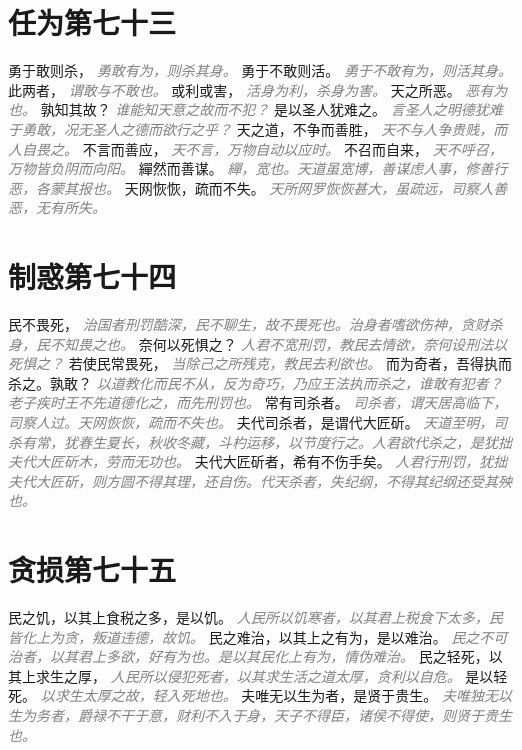 \documentclass[a4paper,zihao=-4,oneside,landscape,UTF8]{ctexart}
\newcommand{\zhushi}[1]{\scriptsize{\textit{\textcolor{gray}{#1}}}\normalsize}
\begin{document}
\section{任为第七十三}

勇于敢则杀，
\zhushi{勇敢有为，则杀其身。}
勇于不敢则活。
\zhushi{勇于不敢有为，则活其身。}
此两者，
\zhushi{谓敢与不敢也。}
或利或害，
\zhushi{活身为利，杀身为害。}
天之所恶。
\zhushi{恶有为也。}
孰知其故？
\zhushi{谁能知天意之故而不犯？}
是以圣人犹难之。
\zhushi{言圣人之明德犹难于勇敢，况无圣人之德而欲行之乎？}
天之道，不争而善胜，
\zhushi{天不与人争贵贱，而人自畏之。}
不言而善应，
\zhushi{天不言，万物自动以应时。}
不召而自来，
\zhushi{天不呼召，万物皆负阴而向阳。}
繟然而善谋。
\zhushi{繟，宽也。天道虽宽博，善谋虑人事，修善行恶，各蒙其报也。}
天网恢恢，疏而不失。
\zhushi{天所网罗恢恢甚大，虽疏远，司察人善恶，无有所失。}


\section{制惑第七十四}

民不畏死，
\zhushi{治国者刑罚酷深，民不聊生，故不畏死也。治身者嗜欲伤神，贪财杀身，民不知畏之也。}
奈何以死惧之？
\zhushi{人君不宽刑罚，教民去情欲，奈何设刑法以死惧之？}
若使民常畏死，
\zhushi{当除己之所残克，教民去利欲也。}
而为奇者，吾得执而杀之。孰敢？
\zhushi{以道教化而民不从，反为奇巧，乃应王法执而杀之，谁敢有犯者？老子疾时王不先道德化之，而先刑罚也。}
常有司杀者。
\zhushi{司杀者，谓天居高临下，司察人过。天网恢恢，疏而不失也。}
夫代司杀者，是谓代大匠斫。
\zhushi{天道至明，司杀有常，犹春生夏长，秋收冬藏，斗杓运移，以节度行之。人君欲代杀之，是犹拙夫代大匠斫木，劳而无功也。}
夫代大匠斫者，希有不伤手矣。
\zhushi{人君行刑罚，犹拙夫代大匠斫，则方圆不得其理，还自伤。代天杀者，失纪纲，不得其纪纲还受其殃也。}


\section{贪损第七十五}

民之饥，以其上食税之多，是以饥。
\zhushi{人民所以饥寒者，以其君上税食下太多，民皆化上为贪，叛道违德，故饥。}
民之难治，以其上之有为，是以难治。
\zhushi{民之不可治者，以其君上多欲，好有为也。是以其民化上有为，情伪难治。}
民之轻死，以其上求生之厚，
\zhushi{人民所以侵犯死者，以其求生活之道太厚，贪利以自危。}
是以轻死。
\zhushi{以求生太厚之故，轻入死地也。}
夫唯无以生为者，是贤于贵生。
\zhushi{夫唯独无以生为务者，爵禄不干于意，财利不入于身，天子不得臣，诸侯不得使，则贤于贵生也。}
\end{document}

